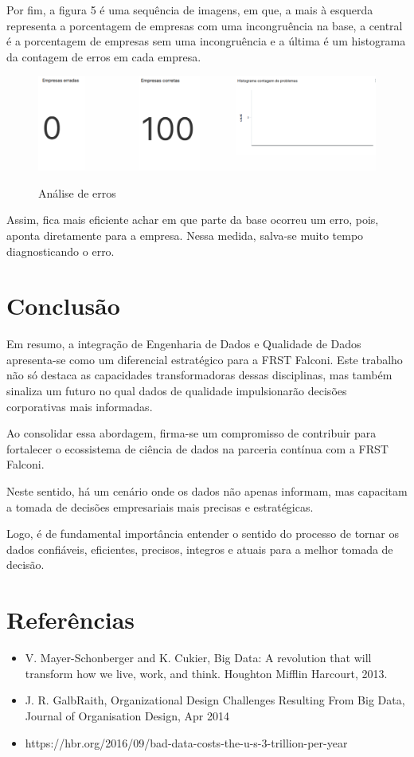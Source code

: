 Por fim, a figura 5 é uma sequência de imagens, em que, a mais à esquerda representa a porcentagem de empresas com uma incongruência na base, a central é a porcentagem de empresas sem uma incongruência e a última é um histograma da contagem de erros em cada empresa.

    \begin{figure}[h!]
        \centering
        \caption{Análise de erros}
        \includegraphics[width = 0.8\linewidth]{relatorios/grupo5/figuras/results4.png}
        \label{fig:mapa}
    \end{figure}    

Assim, fica mais eficiente achar em que parte da base ocorreu um erro, pois, aponta diretamente para a empresa. Nessa medida, salva-se muito tempo diagnosticando o erro.

\section{Conclusão}

Em resumo, a integração de Engenharia de Dados e Qualidade de Dados apresenta-se como um diferencial estratégico para a FRST Falconi. Este trabalho não só destaca as capacidades transformadoras dessas disciplinas, mas também sinaliza um futuro no qual dados de qualidade impulsionarão decisões corporativas mais informadas. 

Ao consolidar essa abordagem, firma-se um compromisso de contribuir para fortalecer o ecossistema de ciência de dados na parceria contínua com a FRST Falconi. 

Neste sentido, há um cenário onde os dados não apenas informam, mas capacitam a tomada de decisões empresariais mais precisas e estratégicas.

Logo, é de fundamental importância entender o sentido do processo de tornar os dados confiáveis, eficientes, precisos, integros e atuais para a melhor tomada de decisão.
\section{Referências}
    \begin{itemize}
        \item V. Mayer-Schonberger and K. Cukier, Big Data: A revolution that will transform how we live, work, and think. Houghton Mifflin Harcourt, 2013.
        \item J. R. GalbRaith, Organizational Design Challenges Resulting From Big Data, Journal of Organisation Design, Apr 2014
        \item https://hbr.org/2016/09/bad-data-costs-the-u-s-3-trillion-per-year
        
    
    \end{itemize}
